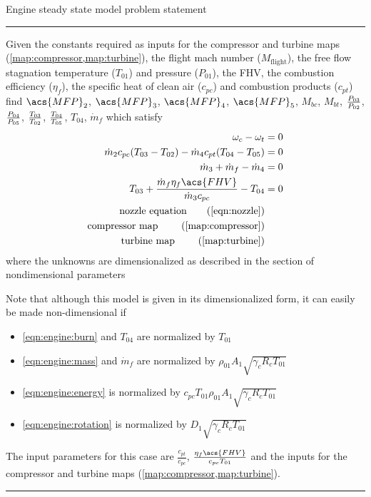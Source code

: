 \documentclass[tcc]{subfiles}
\begin{document}
\begin{table}
\centering
    \caption{Engine steady state model problem statement}
    \label{map:engine}
\begin{minipage}{0.7\textwidth}
    \hrule\vspace{2pt}

    Given the constants required as inputs for the compressor and turbine maps (\cref{map:compressor,map:turbine}), 
    the flight mach number ($M_\text{flight}$), the free flow stagnation temperature ($T_{01}$) and pressure ($P_{01}$), 
    the \acf{FHV}, the combustion efficiency ($\eta_f$),
    the specific heat of clean air ($c_{pc}$) and combustion products ($c_{pt}$) \\ 
    find $\acs{MFP}_2$, $\acs{MFP}_3$, $\acs{MFP}_4$, $\acs{MFP}_5$, $M_{bc}$, $M_{bt}$, $\frac{P_{03}}{P_{02}}$, $\frac{P_{04}}{P_{05}}$, $\frac{T_{03}}{T_{02}}$, $\frac{T_{04}}{T_{05}}$, $T_{04}$, $\dot{m}_f$
    which satisfy
\begin{align}
    \omega_c - \omega_t &= 0 \label{eqn:engine:rotation} \\
    \dot{m}_2 c_{pc} (T_{03}-T_{02}) - \dot{m}_4 c_{pt}(T_{04}-T_{05}) &= 0 \label{eqn:engine:energy}\\
    \dot{m}_3 + \dot{m}_f - \dot{m}_4 &= 0 \label{eqn:engine:mass} \\
    T_{03} + \frac{\dot{m}_f \eta_f \acs{FHV}}{\dot{m}_3 c_{pc}} - T_{04} &= 0 \label{eqn:engine:burn} \\
    \text{nozzle equation} \tag{\cref{eqn:nozzle}} \\
    \text{compressor map } \tag{\cref{map:compressor}} \\
    \text{turbine map    } \tag{\cref{map:turbine}}
\end{align}
   where the unknowns are dimensionalized as described in the section of nondimensional parameters

Note that although this model is given in its dimensionalized form, it can easily be made non-dimensional if
\begin{itemize}
    \item \cref{eqn:engine:burn} and $T_{04}$ are normalized by $T_{01}$
    \item \cref{eqn:engine:mass} and $\dot{m}_f$ are normalized by $\rho_{01} A_1 \sqrt{\gamma_c R_c T_{01}}$
    \item \cref{eqn:engine:energy} is normalized by $c_{pc} T_{01} \rho_{01} A_1 \sqrt{\gamma_c R_c T_{01}}$
    \item \cref{eqn:engine:rotation} is normalized by $D_1\sqrt{\gamma_c R_c T_{01}}$
\end{itemize}
    The input parameters for this case are $\frac{c_{pt}}{c_{pc}}$, $\frac{\eta_f \acs{FHV}}{c_{pc} T_{01}}$ 
and the inputs for the compressor and turbine maps (\cref{map:compressor,map:turbine}).

    \hrule
\end{minipage}
\end{table}
\end{document}
